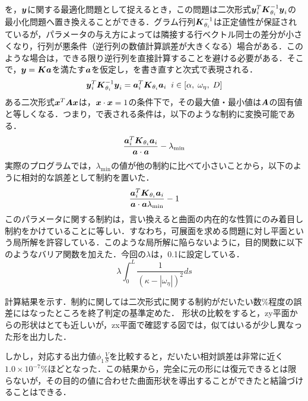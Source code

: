 \documentclass[11pt]{jsarticle}
\begin{document}
			を，$ \boldsymbol{y} $に関する最適化問題として捉えるとき，この問題は二次形式$ \boldsymbol{y}_i^T \boldsymbol{K}_{\theta_i}^{-1} \boldsymbol{y}_i $の最小化問題へ置き換えることができる．グラム行列$ \boldsymbol{K}_{\theta_i}^{-1} $は正定値性が保証されているが，パラメータの与え方によっては隣接する行ベクトル同士の差分が小さくなり，行列が悪条件（逆行列の数値計算誤差が大きくなる）場合がある．このような場合は，できる限り逆行列を直接計算することを避ける必要がある．そこで，$ \boldsymbol{y} = \boldsymbol{K}\boldsymbol{a} $を満たす$ \boldsymbol{a} $を仮定し，を書き直すと次式で表現される．
			\begin{equation}\label{eq:st.likelihood2}
				\boldsymbol{y}_i^T \boldsymbol{K}_{\theta_i}^{-1} \boldsymbol{y}_i  = \boldsymbol{a}_i^T \boldsymbol{K}_{\theta_i} \boldsymbol{a}_i \;\; i\in [\alpha,\;\omega_{\eta},\;D]
			\end{equation}
			ある二次形式$ \boldsymbol{x}^T \boldsymbol{A} \boldsymbol{x} $は，$ \boldsymbol{x}\cdot \boldsymbol{x} = 1 $の条件下で，その最大値・最小値は$ \boldsymbol{A} $の固有値と等しくなる．つまり，で表される条件は，以下のような制約に変換可能である．
			\begin{equation}\label{eq:likelihoodCond}
				 \frac{\boldsymbol{a}_i^T \boldsymbol{K}_{\theta_i} \boldsymbol{a}_i }{\boldsymbol{a} \cdot \boldsymbol{a}} - \lambda_{\min}
			\end{equation}
			実際のプログラムでは，$ \lambda_{\min} $の値が他の制約に比べて小さいことから，以下のように相対的な誤差として制約を置いた．
			\begin{equation}\label{eq:likelihood_cond_by_program}
				\frac{\boldsymbol{a}_i^T \boldsymbol{K}_{\theta_i} \boldsymbol{a}_i }{\boldsymbol{a} \cdot \boldsymbol{a} \lambda_{\min}} -1 
			\end{equation}
			このパラメータに関する制約は，言い換えると曲面の内在的な性質にのみ着目し制約をかけていることに等しい．すなわち，可展面を求める問題に対し平面という局所解を許容している．このような局所解に陥らないように，目的関数に以下のようなバリア関数を加えた．今回の$ \lambda $は，0.1に設定している．
			\begin{equation}
				\lambda \int_{0}^{L} \frac{1}{(\kappa - |\omega_{\eta}|)^2} ds
			\end{equation}
			
			計算結果を示す．制約に関しては二次形式に関する制約がだいたい数$ \% $程度の誤差にはなったところを終了判定の基準定めた．
			形状の比較をすると，zy平面からの形状はとても近しいが，zx平面で確認する図では，似てはいるが少し異なった形を出力した．
			
			しかし，対応する出力値$ \phi_1 \frac{V}{S} $を比較すると，だいたい相対誤差は非常に近く$ 1.0\times 10^{-7} \% $ほどとなった．この結果から，完全に元の形には復元できるとは限らないが，その目的の値に合わせた曲面形状を導出することができたと結論づけることはできる．
			
\end{document}
